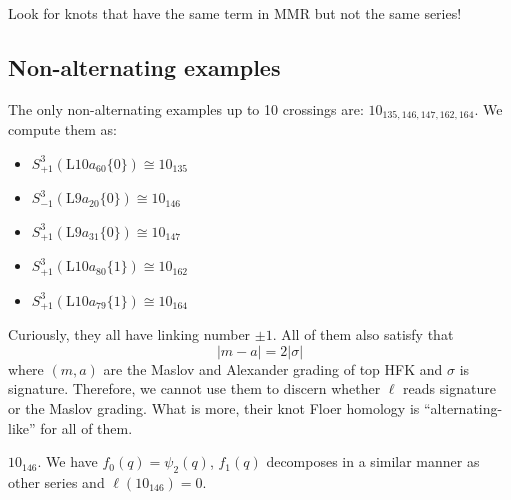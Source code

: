 \documentclass[11pt,e-only]{amsart}
\begin{document}
Look for knots that have the same term in MMR but not the same series!



\subsection{Non-alternating examples}

The only non-alternating examples up to 10 crossings are: $10_{135,146,147,162,164}$. We compute them as:
\begin{itemize}
    \item $S^3_{+1}(\mathrm{L}10a_{60}\{0\})\cong 10_{135}$
    \item $S^3_{-1}(\mathrm{L}9a_{20}\{0\})\cong 10_{146}$
    \item $S^3_{+1}(\mathrm{L}9a_{31}\{0\})\cong 10_{147}$
    \item $S^3_{+1}(\mathrm{L}10a_{80}\{1\})\cong 10_{162}$
    \item $S^3_{+1}(\mathrm{L}10a_{79}\{1\})\cong 10_{164}$
\end{itemize}

Curiously, they all have linking number $\pm 1$. All of them also satisfy that 
\begin{equation}
    |m-a|=2|\sigma|
\end{equation}
where $(m,a)$ are the Maslov and Alexander grading of top HFK and $\sigma$ is signature. Therefore, we cannot use them to discern whether $\ell$ reads signature or the Maslov grading. What is more, their knot Floer homology is ``alternating-like'' for all of them.

\begin{example} $10_{146}$. We have $f_0(q)=\psi_2(q)$, $f_1(q)$ decomposes in a similar manner as other series and $\ell(10_{146})=0$.
\end{example}
\end{document}
